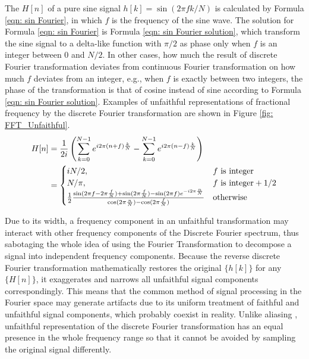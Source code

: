 \documentclass[twoside]{article}
\numberwithin{equation}{section}
\begin{document}
The $H[n]$ of a pure sine signal $h[k] = \sin \left(2\pi f k/N \right)$ is calculated by Formula \eqref{eqn: sin Fourier}, in which $f$ is the frequency of the sine wave.  
The solution for Formula \eqref{eqn: sin Fourier} is Formula \eqref{eqn: sin Fourier solution}, which transform the sine signal to a delta-like function with $\pi/2$ as phase only when $f$ is an integer between $0$ and $N/2$.
In other cases, how much the result of discrete Fourier transformation deviates from continuous Fourier transformation on how much $f$ deviates from an integer, e.g., when $f$ is exactly between two integers, the phase of the transformation is that of cosine instead of sine according to Formula \eqref{eqn: sin Fourier solution}.
Examples of unfaithful representations of fractional frequency by the discrete Fourier transformation are shown in Figure \ref{fig: FFT_Unfaithful}. 
\begin{align}
\centering
\label{eqn: sin Fourier}
H[n] &= \frac{1}{2 i}\left( \sum_{k=0}^{N-1}e^{i 2\pi (n+f)\frac{k}{N}}  - \sum_{k=0}^{N-1} e^{i 2\pi (n-f)\frac{k}{N}} \right) \\
\label{eqn: sin Fourier solution}
&= \begin{cases}
  i N/2, & f \text{ is integer} \\
  N/\pi, & f \text{ is integer} + 1/2 \\
  \frac{1}{2} \frac{\sin(2\pi f - 2\pi \frac{f}{N}) + \sin(2\pi \frac{f}{N})-\sin(2\pi f) e^{-i 2\pi \frac{n}{N}}}{\cos(2\pi \frac{n}{N})-\cos(2\pi \frac{f}{N})} & \text{otherwise}
\end{cases}
\end{align}

Due to its width, a frequency component in an unfaithful transformation may interact with other frequency components of the Discrete Fourier spectrum, thus sabotaging the whole idea of using the Fourier Transformation to decompose a signal into independent frequency components.  
Because the reverse discrete Fourier transformation mathematically restores the original $\{h[k]\}$ for any $\{H[n]\}$, it exaggerates and narrows all unfaithful signal components correspondingly.  
This means that the common method of signal processing in the Fourier space \cite{Numerical_Recipes}\cite{Stochastic_Arithmetic}\cite{Floating-point_Digital_Filters} may generate artifacts due to its uniform treatment of faithful and unfaithful signal components, which probably coexist in reality.  
Unlike aliasing \cite{Electronics}\cite{Numerical_Recipes}\cite{Floating-point_Digital_Filters}, unfaithful representation of the discrete Fourier transformation has an equal presence in the whole frequency range so that it cannot be avoided by sampling the original signal differently.
\end{document}
